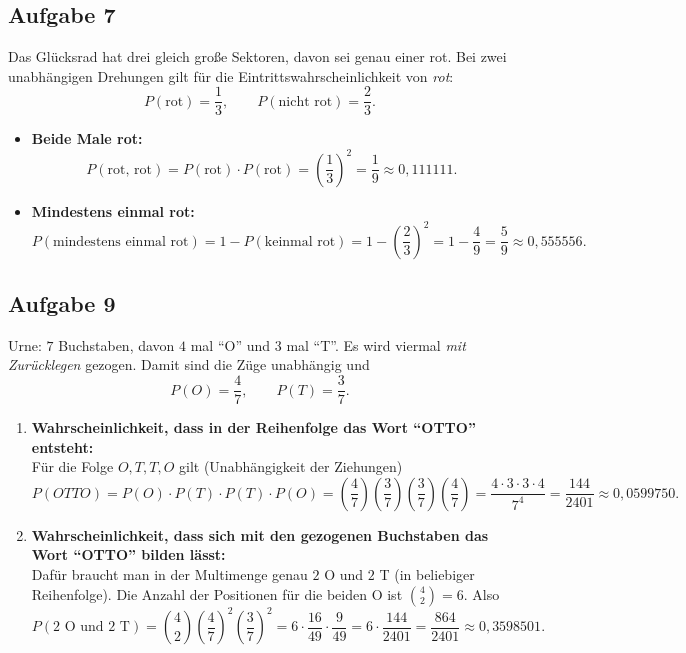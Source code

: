 \documentclass[11pt,a4paper,oneside]{article}
\begin{document}
	\begin{loesung}{}
		\subsection*{Aufgabe 7}
		Das Glücksrad hat drei gleich große Sektoren, davon sei genau einer rot. Bei zwei unabhängigen Drehungen gilt für die Eintrittswahrscheinlichkeit von \textit{rot}:
		\[
		P(\text{rot})=\frac{1}{3},\qquad P(\text{nicht rot})=\frac{2}{3}.
		\]
		
		\begin{itemize}
			\item \textbf{Beide Male rot:}
			\[
			P(\text{rot, rot})=P(\text{rot})\cdot P(\text{rot})=\left(\frac{1}{3}\right)^2=\frac{1}{9}\approx 0{,}111111.
			\]
			
			\item \textbf{Mindestens einmal rot:}
			\[
			P(\text{mindestens einmal rot})=1-P(\text{keinmal rot})=1-\left(\frac{2}{3}\right)^2
			=1-\frac{4}{9}=\frac{5}{9}\approx 0{,}555556.
			\]
		\end{itemize}
	\end{loesung}
			
	\begin{loesung}{}
		\subsection*{Aufgabe 9}
		Urne: \(7\) Buchstaben, davon \(4\) mal ``O'' und \(3\) mal ``T''. Es wird viermal \emph{mit Zurücklegen} gezogen. Damit sind die Züge unabhängig und
		\[
		P(O)=\frac{4}{7},\qquad P(T)=\frac{3}{7}.
		\]
		
		\begin{enumerate}
			\item \textbf{Wahrscheinlichkeit, dass in der Reihenfolge das Wort ``OTTO'' entsteht:}\\
			Für die Folge \(O,T,T,O\) gilt (Unabhängigkeit der Ziehungen)
			\[
			P(OTTO)=P(O)\cdot P(T)\cdot P(T)\cdot P(O)
			=\left(\frac{4}{7}\right)\left(\frac{3}{7}\right)\left(\frac{3}{7}\right)\left(\frac{4}{7}\right)
			=\frac{4\cdot 3\cdot 3\cdot 4}{7^4}=\frac{144}{2401}\approx 0{,}0599750.
			\]
			
			\item \textbf{Wahrscheinlichkeit, dass sich mit den gezogenen Buchstaben das Wort ``OTTO'' bilden lässt:}\\
			Dafür braucht man in der Multimenge genau \(2\) O und \(2\) T (in beliebiger Reihenfolge). Die Anzahl der Positionen für die beiden O ist \(\binom{4}{2}=6\). Also
			\[
			P(\text{2 O und 2 T})=\binom{4}{2}\left(\frac{4}{7}\right)^2\left(\frac{3}{7}\right)^2
			=6\cdot\frac{16}{49}\cdot\frac{9}{49}
			=6\cdot\frac{144}{2401}=\frac{864}{2401}\approx 0{,}3598501.
			\]
		\end{enumerate}
	\end{loesung}
		
\end{document}
